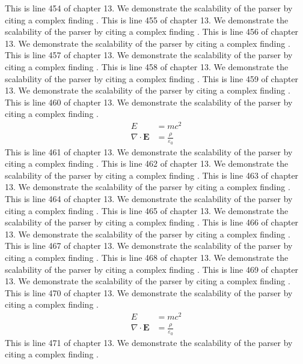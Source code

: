 This is line 454 of chapter 13. We demonstrate the scalability of the parser by citing a complex finding \cite{ref13_454}.
This is line 455 of chapter 13. We demonstrate the scalability of the parser by citing a complex finding \cite{ref13_455}.
This is line 456 of chapter 13. We demonstrate the scalability of the parser by citing a complex finding \cite{ref13_456}.
This is line 457 of chapter 13. We demonstrate the scalability of the parser by citing a complex finding \cite{ref13_457}.
This is line 458 of chapter 13. We demonstrate the scalability of the parser by citing a complex finding \cite{ref13_458}.
This is line 459 of chapter 13. We demonstrate the scalability of the parser by citing a complex finding \cite{ref13_459}.
This is line 460 of chapter 13. We demonstrate the scalability of the parser by citing a complex finding \cite{ref13_460}.
\begin{align*}
  E &= mc^2 \\
  \nabla \cdot \mathbf{E} &= \frac{\rho}{\varepsilon_0}
\end{align*}
This is line 461 of chapter 13. We demonstrate the scalability of the parser by citing a complex finding \cite{ref13_461}.
This is line 462 of chapter 13. We demonstrate the scalability of the parser by citing a complex finding \cite{ref13_462}.
This is line 463 of chapter 13. We demonstrate the scalability of the parser by citing a complex finding \cite{ref13_463}.
This is line 464 of chapter 13. We demonstrate the scalability of the parser by citing a complex finding \cite{ref13_464}.
This is line 465 of chapter 13. We demonstrate the scalability of the parser by citing a complex finding \cite{ref13_465}.
This is line 466 of chapter 13. We demonstrate the scalability of the parser by citing a complex finding \cite{ref13_466}.
This is line 467 of chapter 13. We demonstrate the scalability of the parser by citing a complex finding \cite{ref13_467}.
This is line 468 of chapter 13. We demonstrate the scalability of the parser by citing a complex finding \cite{ref13_468}.
This is line 469 of chapter 13. We demonstrate the scalability of the parser by citing a complex finding \cite{ref13_469}.
This is line 470 of chapter 13. We demonstrate the scalability of the parser by citing a complex finding \cite{ref13_470}.
\begin{align*}
  E &= mc^2 \\
  \nabla \cdot \mathbf{E} &= \frac{\rho}{\varepsilon_0}
\end{align*}
This is line 471 of chapter 13. We demonstrate the scalability of the parser by citing a complex finding \cite{ref13_471}.
